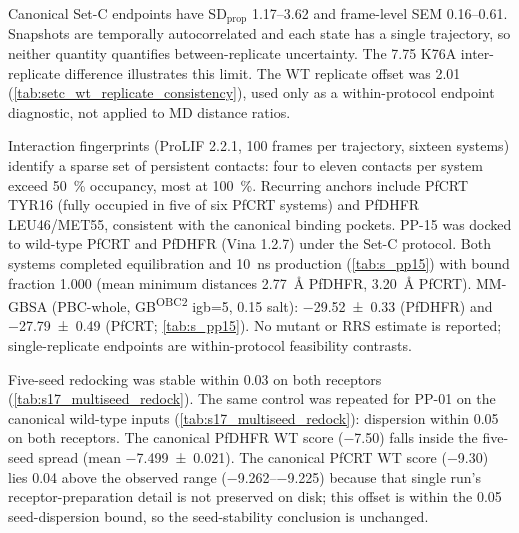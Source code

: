 \documentclass[11pt,a4paper]{article}
\begin{document}
Canonical Set-C endpoints have SD$_{\mathrm{prop}}$ \qtyrange{1.17}{3.62}{\kcalmol} and frame-level SEM \qtyrange{0.16}{0.61}{\kcalmol}. Snapshots are temporally autocorrelated and each state has a single trajectory, so neither quantity quantifies between-replicate uncertainty. The \qty{7.75}{\kcalmol} K76A inter-replicate difference illustrates this limit. The WT replicate offset was \qty{2.01}{\kcalmol} (\cref{tab:setc_wt_replicate_consistency}), used only as a within-protocol endpoint diagnostic, not applied to MD distance ratios.

Interaction fingerprints (ProLIF 2.2.1, \num{100} frames per trajectory, sixteen systems) identify a sparse set of persistent contacts: four to eleven contacts per system exceed \qty{50}{\percent} occupancy, most at \qty{100}{\percent}. Recurring anchors include PfCRT TYR16 (fully occupied in five of six PfCRT systems) and PfDHFR LEU46/MET55, consistent with the canonical binding pockets. PP-15 was docked to wild-type PfCRT and PfDHFR (Vina 1.2.7) under the Set-C protocol. Both systems completed equilibration and \qty{10}{\ns} production (\cref{tab:s_pp15}) with bound fraction \num{1.000} (mean minimum distances \qty{2.77}{\angstrom} PfDHFR, \qty{3.20}{\angstrom} PfCRT). MM-GBSA (PBC-whole, GB\textsuperscript{OBC2} igb=5, \qty{0.15}{\molar} salt): \qty{-29.52 \pm 0.33}{\kcalmol} (PfDHFR) and \qty{-27.79 \pm 0.49}{\kcalmol} (PfCRT; \cref{tab:s_pp15}). No mutant or RRS estimate is reported; single-replicate endpoints are within-protocol feasibility contrasts.

Five-seed redocking was stable within \qty{0.03}{\kcalmol} on both receptors (\cref{tab:s17_multiseed_redock}). The same control was repeated for PP-01 on the canonical wild-type inputs (\cref{tab:s17_multiseed_redock}): dispersion within \qty{0.05}{\kcalmol} on both receptors. The canonical PfDHFR WT score (\qty{-7.50}{\kcalmol}) falls inside the five-seed spread (mean \qty{-7.499 \pm 0.021}{\kcalmol}). The canonical PfCRT WT score (\qty{-9.30}{\kcalmol}) lies \qty{0.04}{\kcalmol} above the observed range (\qtyrange{-9.262}{-9.225}{\kcalmol}) because that single run's receptor-preparation detail is not preserved on disk; this offset is within the \qty{0.05}{\kcalmol} seed-dispersion bound, so the seed-stability conclusion is unchanged.
\end{document}
